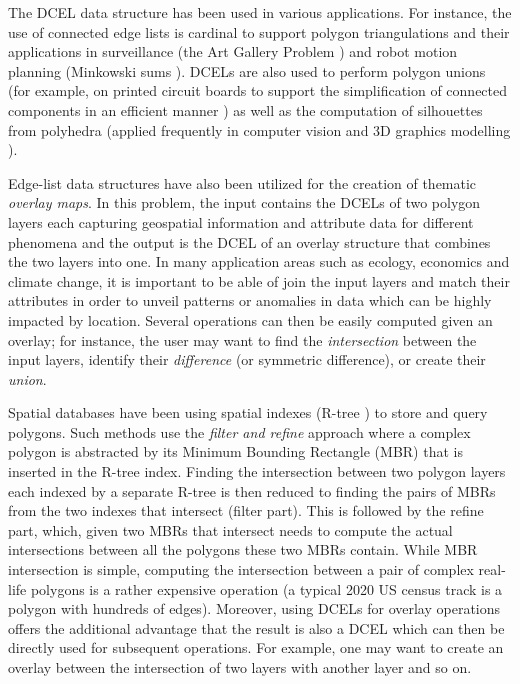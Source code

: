 The DCEL data structure has been used in various applications.
For instance, the use of connected edge lists is cardinal to support polygon triangulations and their applications in surveillance (the Art Gallery Problem
\cite{chvatal_combinatorial_1975, orourke_art_1987}) and robot motion planning (Minkowski sums \cite{berg_computational_2008, chew_convex_1993}).
DCELs are also used to perform polygon unions (for example, on printed circuit boards to support the simplification of connected components in an efficient
manner \cite{fogel_cgal_2012}) as well as the computation of silhouettes from polyhedra \cite{fogel_cgal_2012, berberich_arrangements_2010} (applied frequently
in computer vision and 3D graphics modelling \cite{boguslawski_modelling_2011}).

Edge-list data structures have also been utilized for the creation of thematic \textit{overlay maps}. In this problem, the input contains the DCELs of two
polygon layers each capturing geospatial information and attribute data for different phenomena and the output is the DCEL of an overlay structure that combines
the two layers into one.
In many application areas such as ecology, economics and climate change, it is important to be able of join the input layers and match their attributes in order
to unveil patterns or anomalies in data which can be highly impacted by location.
Several operations can then be easily computed given an overlay; for instance, the user may want to find the \textit{intersection} between the input layers,
identify their \textit{difference} (or symmetric difference), or create their \textit{union}.

Spatial databases have been using spatial indexes (R-tree \cite{rtree, rstar}) to store and query polygons. Such methods use the \textit{filter and refine}
approach where a complex polygon is abstracted by its Minimum Bounding Rectangle (MBR) that is inserted in the R-tree index.
Finding the intersection between two polygon layers each indexed by a separate R-tree is then reduced to finding the pairs of MBRs from the two indexes that
intersect (filter part).
This is followed by the refine part, which, given two MBRs that intersect needs to compute the actual intersections between all the polygons these two MBRs
contain.
While MBR intersection is simple, computing the intersection between a pair of complex real-life polygons is a rather expensive operation (a typical 2020 US
census track is a polygon with hundreds of edges).
Moreover, using DCELs for overlay operations offers the additional advantage that the result is also a DCEL which can then be directly used for subsequent
operations.
For example, one may want to create an overlay between the intersection of two layers with another layer and so on.

